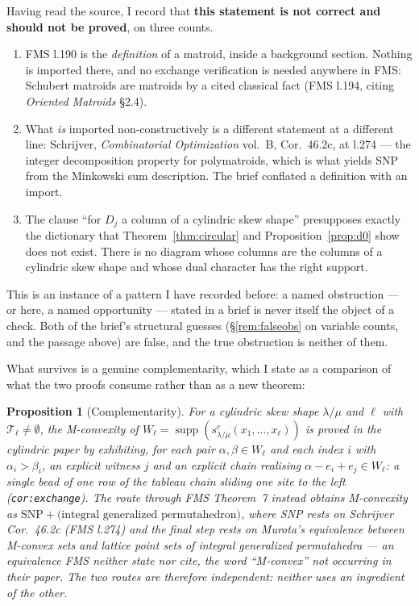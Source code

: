 \documentclass[11pt]{article}
\newtheorem{prop}[thm]{Proposition}
\theoremstyle{definition}
\DeclareMathOperator{\supp}{supp}
\begin{document}
Having read the source, I record that \textbf{this statement is not correct and should not be
proved}, on three counts.

\begin{enumerate}
\item FMS l.190 is the \emph{definition} of a matroid, inside a background section. Nothing is
imported there, and no exchange verification is needed anywhere in FMS: Schubert matroids are
matroids by a cited classical fact (FMS l.194, citing \emph{Oriented Matroids} \S2.4).
\item What \emph{is} imported non-constructively is a different statement at a different line:
Schrijver, \emph{Combinatorial Optimization} vol.~B, Cor.~46.2c, at l.274 --- the integer
decomposition property for polymatroids, which is what yields SNP from the Minkowski sum
description. The brief conflated a definition with an import.
\item The clause ``for $D_j$ a column of a cylindric skew shape'' presupposes exactly the
dictionary that Theorem~\ref{thm:circular} and Proposition~\ref{prop:d0} show does not exist.
There is no diagram whose columns are the columns of a cylindric skew shape and whose dual
character has the right support.
\end{enumerate}

This is an instance of a pattern I have recorded before: a named obstruction --- or here, a
named opportunity --- stated in a brief is never itself the object of a check. Both of the
brief's structural guesses (\S\ref{rem:falseobs} on variable counts, and the passage above) are
false, and the true obstruction is neither of them.

What survives is a genuine complementarity, which I state as a comparison of what the two proofs
consume rather than as a new theorem:

\begin{prop}[Complementarity]\label{prop:complement}
For a cylindric skew shape $\lambda/\mu$ and $\ell$ with $\mathcal{T}_\ell\ne\emptyset$, the
M-convexity of $W_\ell=\supp(s^c_{\lambda/\mu}(x_1,\dots,x_\ell))$ is proved in the cylindric
paper by exhibiting, for each pair $\alpha,\beta\in W_\ell$ and each index $i$ with
$\alpha_i>\beta_i$, an explicit witness $j$ and an explicit chain realising
$\alpha-e_i+e_j\in W_\ell$: a single bead of one row of the tableau chain sliding one site to
the left (\texttt{cor:exchange}). The route through FMS Theorem~7 instead obtains M-convexity as
$\mathrm{SNP}+\text{(integral generalized permutahedron)}$, where SNP rests on Schrijver
Cor.~46.2c (FMS l.274) and the final step rests on Murota's equivalence between M-convex sets
and lattice point sets of integral generalized permutahedra --- an equivalence FMS neither state
nor cite, the word ``M-convex'' not occurring in their paper. The two routes are therefore
independent: neither uses an ingredient of the other.
\end{prop}
\end{document}
